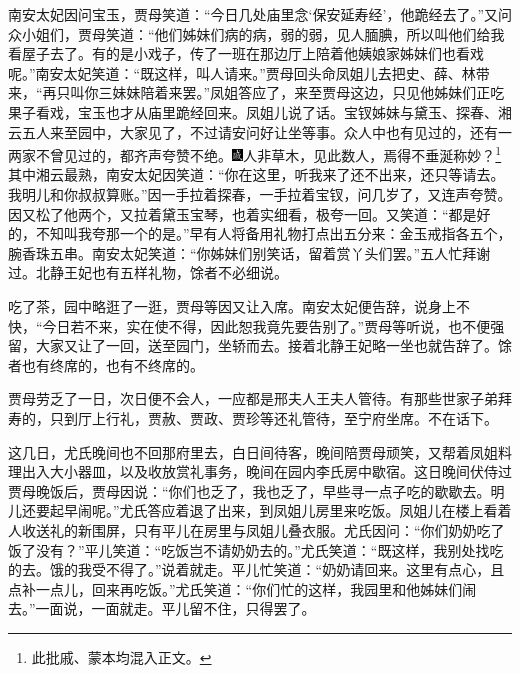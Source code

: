 南安太妃因问宝玉，贾母笑道：“今日几处庙里念‘保安延寿经’，他跪经去了。”又问众小姐们，贾母笑道：“他们姊妹们病的病，弱的弱，见人腼腆，所以叫他们给我看屋子去了。有的是小戏子，传了一班在那边厅上陪着他姨娘家姊妹们也看戏呢。”南安太妃笑道：“既这样，叫人请来。”贾母回头命凤姐儿去把史、薛、林带来，“再只叫你三妹妹陪着来罢。”凤姐答应了，来至贾母这边，只见他姊妹们正吃果子看戏，宝玉也才从庙里跪经回来。凤姐儿说了话。宝钗姊妹与黛玉、探春、湘云五人来至园中，大家见了，不过请安问好让坐等事。众人中也有见过的，还有一两家不曾见过的，都齐声夸赞不绝。{\includegraphics[width=3mm]{../Images/00005}\kaishu 人非草木，见此数人，焉得不垂涎称妙？}\footnote{此批戚、蒙本均混入正文。}其中湘云最熟，南安太妃因笑道：“你在这里，听我来了还不出来，还只等请去。我明儿和你叔叔算账。”因一手拉着探春，一手拉着宝钗，问几岁了，又连声夸赞。因又松了他两个，又拉着黛玉宝琴，也着实细看，极夸一回。又笑道：“都是好的，不知叫我夸那一个的是。”早有人将备用礼物打点出五分来：金玉戒指各五个，腕香珠五串。南安太妃笑道：“你姊妹们别笑话，留着赏丫头们罢。”五人忙拜谢过。北静王妃也有五样礼物，馀者不必细说。

吃了茶，园中略逛了一逛，贾母等因又让入席。南安太妃便告辞，说身上不快，“今日若不来，实在使不得，因此恕我竟先要告别了。”贾母等听说，也不便强留，大家又让了一回，送至园门，坐轿而去。接着北静王妃略一坐也就告辞了。馀者也有终席的，也有不终席的。

贾母劳乏了一日，次日便不会人，一应都是邢夫人王夫人管待。有那些世家子弟拜寿的，只到厅上行礼，贾赦、贾政、贾珍等还礼管待，至宁府坐席。不在话下。

这几日，尤氏晚间也不回那府里去，白日间待客，晚间陪贾母顽笑，又帮着凤姐料理出入大小器皿，以及收放赏礼事务，晚间在园内李氏房中歇宿。这日晚间伏侍过贾母晚饭后，贾母因说：“你们也乏了，我也乏了，早些寻一点子吃的歇歇去。明儿还要起早闹呢。”尤氏答应着退了出来，到凤姐儿房里来吃饭。凤姐儿在楼上看着人收送礼的新围屏，只有平儿在房里与凤姐儿叠衣服。尤氏因问：“你们奶奶吃了饭了没有？”平儿笑道：“吃饭岂不请奶奶去的。”尤氏笑道：“既这样，我别处找吃的去。饿的我受不得了。”说着就走。平儿忙笑道：“奶奶请回来。这里有点心，且点补一点儿，回来再吃饭。”尤氏笑道：“你们忙的这样，我园里和他姊妹们闹去。”一面说，一面就走。平儿留不住，只得罢了。

